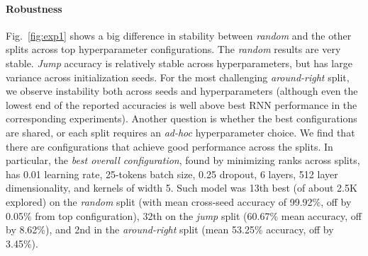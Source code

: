 \paragraph{Robustness} Fig.~\ref{fig:exp1} shows a big difference in
stability between \emph{random} and the other splits across top
hyperparameter configurations. The \emph{random} results are very
stable. \emph{Jump} accuracy is relatively stable across
hyperparameters, but has large variance across initialization
seeds. For the most challenging \emph{around-right} split, we observe
instability both across seeds and hyperparameters (although even the
lowest end of the reported accuracies is well above best RNN
performance in the corresponding experiments). Another question is
whether the best configurations are shared, or each split requires an
\emph{ad-hoc} hyperparameter choice. We find that there are configurations
that achieve good performance across the splits. In particular, the
\emph{best overall configuration}, found by minimizing ranks across
splits, has 0.01 learning rate, 25-tokens batch size, 0.25
dropout, 6 layers, 512 layer dimensionality, and kernels of width
5. Such model was 13th best (of about 2.5K explored) on the
\emph{random} split (with mean cross-seed accuracy of 99.92\%, off
by 0.05\% from top configuration), 32th on the \emph{jump} split
(60.67\% mean accuracy, off by 8.62\%), and 2nd in the
\emph{around-right} split (mean 53.25\% accuracy, off by 3.45\%).


